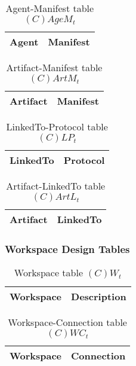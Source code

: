 \begin{table}[H]
	\centering
	\begin{tabular}{|p{4cm}|p{8cm}|}
			\hline
			\textbf{Agent} & \textbf{Manifest} \\
			\hline
			\hline
		\end{tabular}
	\caption{Agent-Manifest table $(C)AgeM_t$}
	\label{tab:cagemt}
\end{table}

\begin{table}[H]
	\centering
	\begin{tabular}{|p{4cm}|p{8cm}|}
			\hline
			\textbf{Artifact} & \textbf{Manifest} \\
			\hline
			\hline
		\end{tabular}
	\caption{Artifact-Manifest table $(C)ArtM_t$}
	\label{tab:cartmt}
\end{table}

\begin{table}[H]
	\centering
	\begin{tabular}{|p{4cm}|p{8cm}|}
			\hline
			\textbf{LinkedTo} & \textbf{Protocol} \\
			\hline
			\hline
		\end{tabular}
	\caption{LinkedTo-Protocol table $(C)LP_t$}
	\label{tab:clpt}
\end{table}

\begin{table}[H]
	\centering
	\begin{tabular}{|p{4cm}|p{8cm}|}
			\hline
			\textbf{Artifact} & \textbf{LinkedTo} \\
			\hline
			\hline
		\end{tabular}
	\caption{Artifact-LinkedTo table $(C)ArtL_t$}
	\label{tab:cartlt}
\end{table}

\subsubsection{Workspace Design Tables}

\begin{table}[H]
	\centering
	\begin{tabular}{|p{4cm}|p{8cm}|}
			\hline
			\textbf{Workspace} & \textbf{Description} \\
			\hline
			\hline
		\end{tabular}
	\caption{Workspace table $(C)W_t$}
	\label{tab:cwt}
\end{table}

\begin{table}[H]
	\centering
	\begin{tabular}{|p{4cm}|p{8cm}|}
			\hline
			\textbf{Workspace} & \textbf{Connection} \\
			\hline
			\hline
		\end{tabular}
	\caption{Workspace-Connection table $(C)WC_t$}
	\label{tab:cwct}
\end{table}

